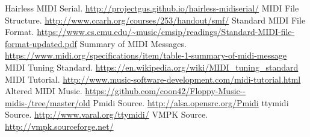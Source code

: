 \documentclass[11pt, a4paper]{report}
\begin{document}
\renewcommand{\bibname}{References}
\begin{thebibliography}{9}
 Hairless MIDI Serial. 
\url{http://projectgus.github.io/hairless-midiserial/}
MIDI File Structure. 
\url{http://www.ccarh.org/courses/253/handout/smf/} 
Standard MIDI File Format.
\url{https://www.cs.cmu.edu/~music/cmsip/readings/Standard-MIDI-file-format-updated.pdf}
Summary of MIDI Messages.
\url{https://www.midi.org/specifications/item/table-1-summary-of-midi-message}
MIDI Tuning Standard. 
\url{https://en.wikipedia.org/wiki/MIDI_tuning_standard}
MIDI Tutorial. 
\url{http://www.music-software-development.com/midi-tutorial.html}
Altered MIDI Music.
\url{https://github.com/coon42/Floppy-Music--midis-/tree/master/old}
Pmidi Source.
\url{http://alsa.opensrc.org/Pmidi}
ttymidi Source.
\url{http://www.varal.org/ttymidi/}
VMPK Source.
\url{http://vmpk.sourceforge.net/}
\end{thebibliography}
\end{document}
